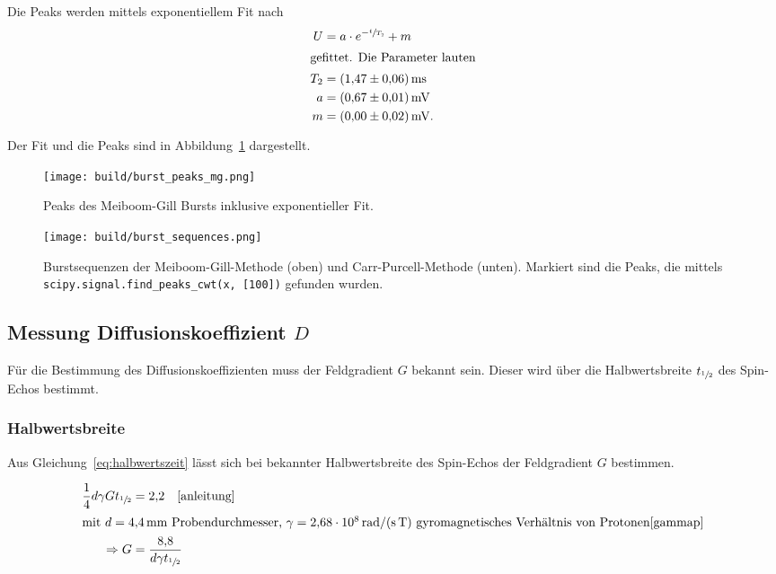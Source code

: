 Die Peaks werden mittels exponentiellem Fit nach
\begin{align}
  \nonumber U &= a \cdot e^{-\sfrac{t}{T_2}} + m \\
  \intertext{gefittet. Die Parameter lauten}
  \label{eq:t2} T_2 &= \SI{1.47 \pm 0.06}{\milli\second} \\
  \nonumber a &= \SI{0.67 \pm 0.01}{\milli\volt} \\
  \nonumber m &= \SI{0.00 \pm 0.02}{\milli\volt}.
\end{align}

Der Fit und die Peaks sind in Abbildung~\ref{fig:peaks} dargestellt.
\begin{figure}[ht]
  \centering
  \texttt{[image: build/burst\_peaks\_mg.png]}
  \caption{Peaks des Meiboom-Gill Bursts inklusive exponentieller Fit.}%
  \label{fig:peaks}
\end{figure}

\begin{figure}[ht]
  \centering
  \texttt{[image: build/burst\_sequences.png]}
  \caption{%
    Burstsequenzen der Meiboom-Gill-Methode (oben) und Carr-Purcell-Methode (unten).
    Markiert sind die Peaks, die mittels \texttt{scipy.signal.find\_peaks\_cwt(x, [100])}\cite{scipy} gefunden wurden.
  }%
  \label{fig:burst_sequences}
\end{figure}

\subsection{Messung Diffusionskoeffizient \texorpdfstring{$D$}{D}}%
\label{sub:messung_diffusionskoeffizient_d_}

Für die Bestimmung des Diffusionskoeffizienten muss der Feldgradient $G$ bekannt sein.
Dieser wird über die Halbwertsbreite $t_{\sfrac{1}{2}}$ des Spin-Echos bestimmt.

\subsubsection{Halbwertsbreite}%
\label{sub:halbwertsbreite}

Aus Gleichung~\eqref{eq:halbwertszeit} lässt sich bei bekannter Halbwertsbreite des Spin-Echos der Feldgradient $G$ bestimmen.

\begin{align}
  \nonumber
  \frac{1}{4} d \gamma G t_{\sfrac{1}{2}} &= \num{2.2} \hspace{1em} \text{\cite{anleitung}} \\
  \intertext{mit $d = \SI{4.4}{\milli\meter}$ Probendurchmesser, $\gamma = \SI{2.68e8}{\radian\per\second\per\tesla}$ gyromagnetisches Verhältnis von Protonen\cite{gammap}}
  \label{eq:halbwertszeit}
  \Rightarrow G &= \frac{\num{8.8}}{d \gamma t_{\sfrac{1}{2}}}
\end{align}

